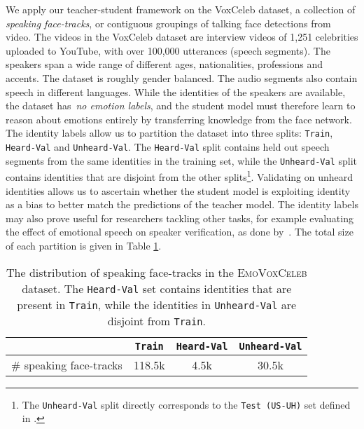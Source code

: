 \documentclass[sigconf]{acmart}
\newcommand{\datasetName}{\textsc{EmoVoxCeleb}}
\begin{document}
We apply our teacher-student framework on the VoxCeleb \cite{Nagrani17} dataset, a collection of \textit{speaking face-tracks}, or contiguous groupings of talking face detections from video. The videos in the VoxCeleb dataset are interview videos of 1,251 celebrities uploaded to YouTube, with over 100,000 utterances (speech segments). The speakers span a wide range of different ages, nationalities, professions and accents. The dataset is roughly gender balanced. The audio segments also contain speech in different languages.
While the identities of the speakers are available, the dataset has~\textit{no emotion labels}, and the student model must therefore learn to reason about emotions entirely by transferring knowledge from the face network.  The identity labels allow us to partition the dataset into three splits: \texttt{Train}, \texttt{Heard-Val} and \texttt{Unheard-Val}.  The \texttt{Heard-Val} split contains 
held out speech segments from the same identities in the training set, while the \texttt{Unheard-Val} split contains identities that are disjoint from the other splits\footnote{The \texttt{Unheard-Val} split directly corresponds to the \texttt{Test (US-UH)} set defined in \cite{nagrani2018learnable}.}.  Validating on unheard identities allows us to ascertain whether the student model is exploiting identity as a bias to better match the predictions of the teacher model.  The identity labels may also prove useful for researchers tackling other tasks, for example evaluating the effect of emotional speech on speaker verification, as done by~\cite{parthasarathy2017study}.  The total size of each partition is given in Table \ref{tab:stats}.

\setlength{\tabcolsep}{0.7em} \begin{table}
\centering

\begin{tabular}{rccc}
\multicolumn{1}{c}{}&\multicolumn{1}{c}{\texttt{Train}}&\multicolumn{1}{c}{\texttt{Heard-Val}}&\multicolumn{1}{c}{\texttt{Unheard-Val}} \\   \hline         
\# speaking face-tracks  & 118.5k  & 4.5k & 30.5k    \\

\end{tabular}
\vspace{2ex}
\caption{ The distribution of speaking face-tracks in the \datasetName{} dataset. The \texttt{Heard-Val} set contains identities that are present in \texttt{Train}, while the identities in \texttt{Unheard-Val} are disjoint from \texttt{Train}.\label{tab:stats}}
\end{table}
\end{document}
